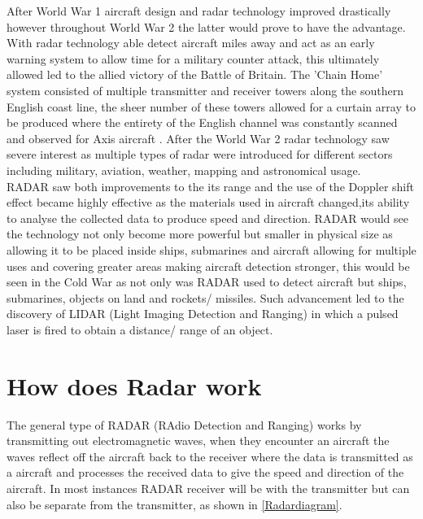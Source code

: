 \documentclass[12pt]{article}
\begin{document}
After World War 1 aircraft design and radar technology improved drastically however throughout World War 2 the latter would prove to have the advantage. With radar technology able detect aircraft miles away and act as an early warning system to allow time for a military counter attack, this ultimately allowed led to the allied victory of the Battle of Britain. The 'Chain Home' system consisted of multiple transmitter and receiver towers along the southern English coast line, the sheer number of these towers allowed for a curtain array to be produced where the entirety of the English channel was constantly scanned and observed for Axis aircraft \cite{Britain}. After the World War 2 radar technology saw severe interest as multiple types of radar were introduced for different sectors including military, aviation, weather, mapping and astronomical usage. \\

RADAR saw both improvements to the its range and the use of the Doppler shift effect became highly effective as the materials used in aircraft changed,its ability to analyse the collected data to produce speed and direction. RADAR would see the technology not only become more powerful but smaller in physical size as allowing it to be placed inside ships, submarines and aircraft allowing for multiple uses and covering greater areas making aircraft detection stronger, this would be seen in the Cold War as not only was RADAR used to detect aircraft but ships, submarines, objects on land and rockets/ missiles. Such advancement led to the discovery of LIDAR (Light Imaging Detection and Ranging) in which a pulsed laser is fired to obtain a distance/ range of an object.

\section{How does Radar work}
\label{How does Section}

The general type of RADAR (RAdio Detection and Ranging) works by transmitting out electromagnetic waves, when they encounter an aircraft the waves reflect off the aircraft back to the receiver where the data is transmitted as a aircraft and processes the received data to give the speed and direction of the aircraft. In most instances RADAR receiver will be with the transmitter but can also be separate from the transmitter, as shown in \cref{Radardiagram}. 
\end{document}

